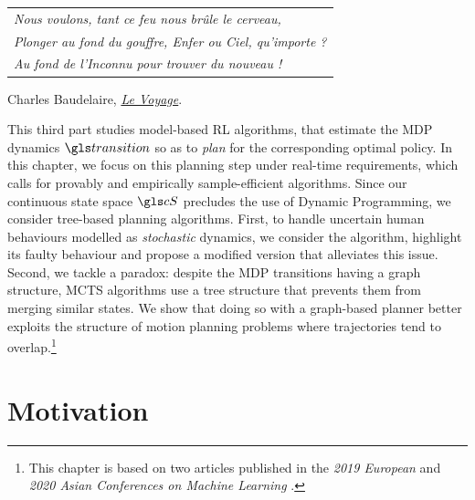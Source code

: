 
\graphicspath{{2-Chapters/6-Chapter/}}

\label{chapter:6}

\begin{flushright}
	\begin{tabular}{@{}l@{}}
		\emph{Nous voulons, tant ce feu nous brûle le cerveau,}\\
		\emph{Plonger au fond du gouffre, Enfer ou Ciel, qu’importe ?}\\
		\emph{Au fond de l’Inconnu pour trouver du nouveau !}\\
	\end{tabular}
	
	Charles Baudelaire, \href{https://eleurent.github.io/sisyphe/texts/le-voyage.html}{\emph{Le Voyage}}.
\end{flushright}

\abstractStartChapter{}%

This third part studies model-based \gls{RL} algorithms, that estimate the \gls{MDP} dynamics $\Ps$ so as to \emph{plan} for the corresponding optimal policy.
In this chapter, we focus on this planning step under real-time requirements, which calls for provably and empirically sample-efficient algorithms. Since our continuous state space $\cS$ precludes the use of Dynamic Programming, we consider tree-based planning algorithms. First, to handle uncertain human behaviours modelled as \emph{stochastic} dynamics, we consider the \OLOP algorithm, highlight its faulty behaviour and propose a modified version that alleviates this issue. Second, we tackle a paradox: despite the \gls{MDP} transitions having a graph structure, \gls{MCTS} algorithms use a tree structure that prevents them from merging similar states. We show that doing so with a graph-based planner better exploits the structure of motion planning problems where trajectories tend to overlap.\footnote{This chapter is based on two articles published in the \emph{2019 European} and \emph{2020 Asian Conferences on Machine Learning} \citep{Leurent2020practical,Leurent2020monte}.}
\minitocStartChapter{}

\section{Motivation}

